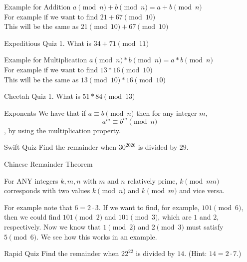 \documentclass[aspectratio=169,xcolor=dvipsnames]{beamer}
\begin{document}
\begin{frame}{Example for Addition}
    $a\pmod{n}+b\pmod{n}  = a+b\pmod{n}$\\
    \vspace{1cm}
For example if we want to find $21+67\pmod{10}$ \\
\vspace{1cm}
This will be the same as $21\pmod{10}+67\pmod{10}$
\end{frame}

\begin{frame}{Expeditious Quiz}
    1. What is $34+71\pmod{11}$
\end{frame}

\begin{frame}{Example for Multiplication}
    $a\pmod{n}*b\pmod{n}  = a*b\pmod{n}$\\
    \vspace{1cm}
For example if we want to find $13*16\pmod{10}$ \\
\vspace{1cm}
This will be the same as $13\pmod{10}*16\pmod{10}$
\end{frame}

\begin{frame}{Cheetah Quiz}
    1. What is $51*84\pmod{13}$
\end{frame}

\begin{frame}{Exponents}
    We have that if $a\equiv b\pmod{n}$ then for any integer $m$, \[a^m\equiv b^m\pmod n\], by using the multiplication property.
\end{frame}
\begin{frame}{Swift Quiz}
    Find the remainder when $30^{2026}$ is divided by $29$.
\end{frame}
\begin{frame}{Chinese Remainder Theorem}
    \begin{theorem}
    For ANY integers $k,m,n$ with $m$ and $n$ relatively prime, $k \pmod{mn}$ corresponds with two values $k\pmod n$ and $k\pmod m$ and vice versa. 
    \end{theorem}
    For example note that $6=2\cdot3$. If we want to find, for example, $101\pmod6$, then we could find $101\pmod2$ and $101\pmod 3$, which are $1$ and $2$, respectively. Now we know that $1\pmod2$ and $2\pmod3$ must satisfy $5\pmod6$. We see how this works in an example.
\end{frame}

\begin{frame}{Rapid Quiz}
    Find the remainder when $22^{22}$ is divided by $14$. (Hint: $14=2\cdot7$.)
\end{frame}
\end{document}
